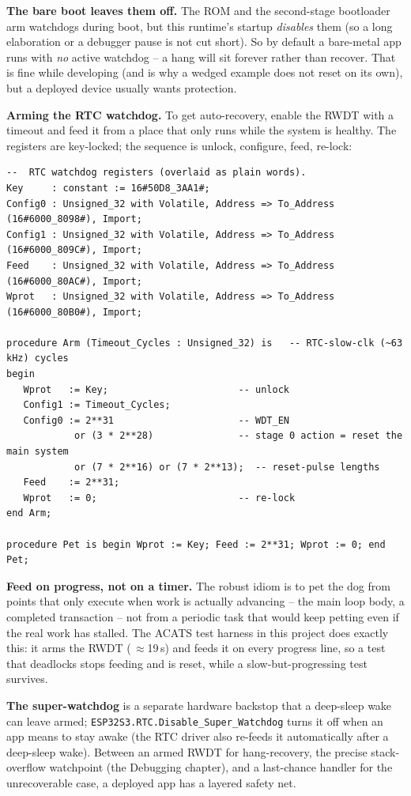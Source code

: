 \textbf{The bare boot leaves them off.} The ROM and the second-stage bootloader
arm watchdogs during boot, but this runtime's startup \emph{disables} them (so a
long elaboration or a debugger pause is not cut short). So by default a bare-metal
app runs with \emph{no} active watchdog -- a hang will sit forever rather than
recover. That is fine while developing (and is why a wedged example does not
reset on its own), but a deployed device usually wants protection.

\textbf{Arming the RTC watchdog.} To get auto-recovery, enable the RWDT with a
timeout and feed it from a place that only runs while the system is healthy. The
registers are key-locked; the sequence is unlock, configure, feed, re-lock:

\begin{lstlisting}
--  RTC watchdog registers (overlaid as plain words).
Key     : constant := 16#50D8_3AA1#;
Config0 : Unsigned_32 with Volatile, Address => To_Address (16#6000_8098#), Import;
Config1 : Unsigned_32 with Volatile, Address => To_Address (16#6000_809C#), Import;
Feed    : Unsigned_32 with Volatile, Address => To_Address (16#6000_80AC#), Import;
Wprot   : Unsigned_32 with Volatile, Address => To_Address (16#6000_80B0#), Import;

procedure Arm (Timeout_Cycles : Unsigned_32) is   -- RTC-slow-clk (~63 kHz) cycles
begin
   Wprot   := Key;                       -- unlock
   Config1 := Timeout_Cycles;
   Config0 := 2**31                      -- WDT_EN
            or (3 * 2**28)               -- stage 0 action = reset the main system
            or (7 * 2**16) or (7 * 2**13);  -- reset-pulse lengths
   Feed    := 2**31;
   Wprot   := 0;                         -- re-lock
end Arm;

procedure Pet is begin Wprot := Key; Feed := 2**31; Wprot := 0; end Pet;
\end{lstlisting}

\textbf{Feed on progress, not on a timer.} The robust idiom is to pet the dog from
points that only execute when work is actually advancing -- the main loop body, a
completed transaction -- not from a periodic task that would keep petting even if
the real work has stalled. The ACATS test harness in this project does exactly
this: it arms the RWDT (\,$\approx$19\,s) and feeds it on every progress line, so a
test that deadlocks stops feeding and is reset, while a slow-but-progressing test
survives.

\textbf{The super-watchdog} is a separate hardware backstop that a deep-sleep wake
can leave armed; \texttt{ESP32S3.RTC.Disable\_Super\_Watchdog} turns it off when an
app means to stay awake (the RTC driver also re-feeds it automatically after a
deep-sleep wake). Between an armed RWDT for hang-recovery, the precise
stack-overflow watchpoint (the Debugging chapter), and a last-chance handler for
the unrecoverable case, a deployed app has a layered safety net.

